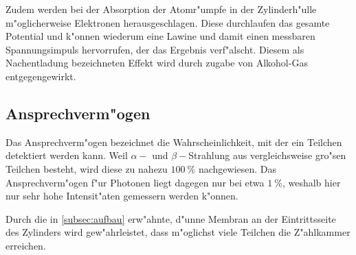 		Zudem werden bei der Absorption der Atomr"umpfe in der Zylinderh"ulle m"oglicherweise Elektronen herausgeschlagen.
		Diese durchlaufen das gesamte Potential und k"onnen wiederum eine Lawine und damit einen messbaren Spannungsimpuls hervorrufen, der das Ergebnis verf"alscht.
		Diesem als Nachentladung bezeichneten Effekt wird durch zugabe von Alkohol-Gas entgegengewirkt.

	\subsection{Ansprechverm"ogen}
	\label{subsec:ansprechvermoegen}
		Das Ansprechverm"ogen bezeichnet die Wahrscheinlichkeit, mit der ein Teilchen detektiert werden kann.
		Weil $\alpha-$ und $\beta-$Strahlung aus vergleichsweise gro"sen Teilchen besteht, wird diese zu nahezu $\SI{100}{\percent}$ nachgewiesen.
		Das Ansprechverm"ogen f"ur Photonen liegt dagegen nur bei etwa $\SI{1}{\percent}$, weshalb hier nur sehr hohe Intensit"aten gemessern werden k"onnen.

		Durch die in \ref{subsec:aufbau} erw"ahnte, d"unne Membran an der Eintrittsseite des Zylinders wird gew"ahrleistet, dass m"oglichst viele Teilchen die Z"ahlkammer erreichen.